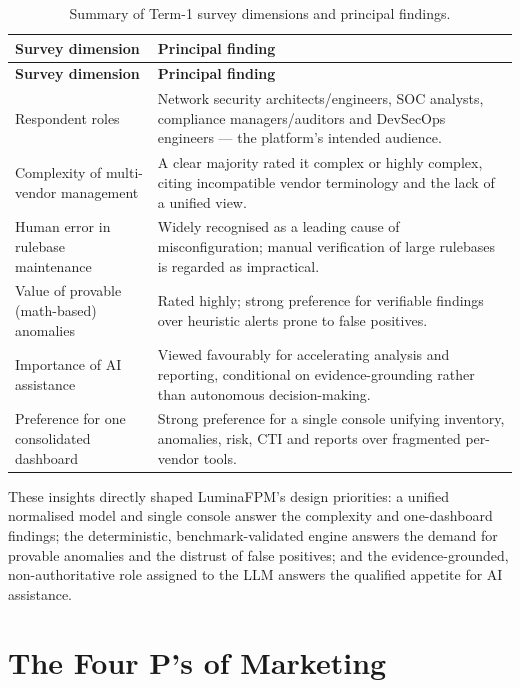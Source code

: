 \documentclass[12pt,a4paper]{report}
\renewcommand{\_}{\textunderscore\allowbreak}
\newcommand{\hrow}{}
\newcommand{\hcell}[1]{\textbf{#1}}
\newcommand{\altrow}{}
\begin{document}
\begin{longtable}{L{0.34\textwidth} L{0.58\textwidth}}
\caption{Summary of Term-1 survey dimensions and principal findings.}
\label{tab:ch2-survey}\\
\hline
\hcell{Survey dimension} & \hcell{Principal finding} \\
\hline
\endfirsthead
\hline
\hcell{Survey dimension} & \hcell{Principal finding} \\
\hline
\endhead
\hline
\endfoot
\hline
\endlastfoot
\hrow
Respondent roles & Network security architects/engineers, SOC analysts, compliance managers/auditors and DevSecOps engineers --- the platform's intended audience. \\
\altrow
Complexity of multi-vendor management & A clear majority rated it complex or highly complex, citing incompatible vendor terminology and the lack of a unified view. \\
\hrow
Human error in rulebase maintenance & Widely recognised as a leading cause of misconfiguration; manual verification of large rulebases is regarded as impractical. \\
\altrow
Value of provable (math-based) anomalies & Rated highly; strong preference for verifiable findings over heuristic alerts prone to false positives. \\
\hrow
Importance of AI assistance & Viewed favourably for accelerating analysis and reporting, conditional on evidence-grounding rather than autonomous decision-making. \\
\altrow
Preference for one consolidated dashboard & Strong preference for a single console unifying inventory, anomalies, risk, CTI and reports over fragmented per-vendor tools. \\
\end{longtable}

These insights directly shaped LuminaFPM's design priorities: a unified normalised model and single console answer the complexity and one-dashboard findings; the deterministic, benchmark-validated engine answers the demand for provable anomalies and the distrust of false positives; and the evidence-grounded, non-authoritative role assigned to the LLM answers the qualified appetite for AI assistance.

\section{The Four P's of Marketing}
\label{sec:ch2-fourps}
\end{document}
